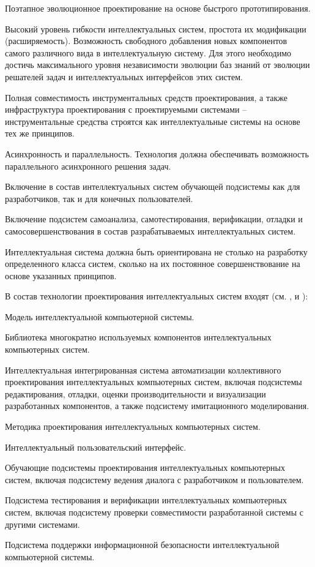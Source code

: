 \begin{partbacktext}
\begin{textitemize}
	\item Поэтапное эволюционное проектирование на основе быстрого прототипирования.
	\item Высокий уровень гибкости интеллектуальных систем, простота их модификации (расширяемость). Возможность свободного добавления новых компонентов самого различного вида в интеллектуальную систему. Для этого необходимо достичь максимального уровня независимости эволюции баз знаний от эволюции решателей задач и интеллектуальных интерфейсов этих систем.
	\item Полная совместимость инструментальных средств проектирования, а также инфраструктура проектирования с проектируемыми системами -- инструментальные средства строятся как интеллектуальные системы на основе тех же принципов.
	\item Асинхронность и параллельность. Технология должна обеспечивать возможность параллельного асинхронного решения задач.
	\item Включение в состав интеллектуальных систем обучающей подсистемы как для разработчиков, так и для конечных пользователей.
	\item Включение подсистем самоанализа, самотестирования, верификации, отладки и самосовершенствования в состав разрабатываемых интеллектуальных систем.
\end{textitemize}

Интеллектуальная система должна быть ориентирована не столько на разработку определенного класса систем, сколько на их постоянное совершенствование на основе указанных принципов.

В состав технологии проектирования интеллектуальных систем входят (см. ,  и ):
\begin{textitemize}
	\item Модель интеллектуальной компьютерной системы.
	\item Библиотека многократно используемых компонентов интеллектуальных компьютерных систем.
	\item Интеллектуальная интегрированная система автоматизации коллективного проектирования интеллектуальных компьютерных систем, включая подсистемы редактирования, отладки, оценки производительности и визуализации разработанных компонентов, а также подсистему имитационного моделирования.
	\item Методика проектирования интеллектуальных компьютерных систем.
	\item Интеллектуальный пользовательский интерфейс.
	\item Обучающие подсистемы проектирования интеллектуальных компьютерных систем, включая подсистему ведения диалога с разработчиком и пользователем.
	\item Подсистема тестирования и верификации интеллектуальных компьютерных систем, включая подсистему проверки совместимости разработанной системы с другими системами.
	\item Подсистема поддержки информационной безопасности интеллектуальной компьютерной системы.
\end{textitemize}


\end{partbacktext}
